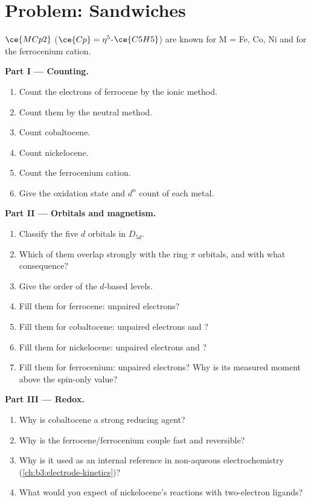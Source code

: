 \section{Problem: Sandwiches}

\begin{problem}
\label{pb:b3:organometallic-bonding:1}
 $\ce{MCp2}$ ($\ce{Cp} = \eta^5$-$\ce{C5H5}$) are known for M = Fe, Co, Ni and for the ferrocenium cation.

\medskip\noindent\textbf{Part I --- Counting.}
\begin{enumerate}
  \item Count the electrons of ferrocene by the ionic method.
  \item Count them by the neutral method.
  \item Count cobaltocene.
  \item Count nickelocene.
  \item Count the ferrocenium cation.
  \item Give the oxidation state and $d^n$ count of each metal.
\end{enumerate}

\medskip\noindent\textbf{Part II --- Orbitals and magnetism.}
\begin{enumerate}[resume]
  \item Classify the five $d$ orbitals in $D_{5d}$.
  \item Which of them overlap strongly with the ring $\pi$ orbitals, and with what
        consequence?
  \item Give the order of the $d$-based levels.
  \item Fill them for ferrocene: unpaired electrons?
  \item Fill them for cobaltocene: unpaired electrons and ?
  \item Fill them for nickelocene: unpaired electrons and ?
  \item Fill them for ferrocenium: unpaired electrons? Why is its measured moment
        above the spin-only value?
\end{enumerate}

\medskip\noindent\textbf{Part III --- Redox.}
\begin{enumerate}[resume]
  \item Why is cobaltocene a strong reducing agent?
  \item Why is the ferrocene/ferrocenium couple fast and reversible?
  \item Why is it used as an internal reference in non-aqueous electrochemistry
        (\cref{ch:b3:electrode-kinetics})?
  \item What would you expect of nickelocene's reactions with two-electron
        ligands?
\end{enumerate}


\end{problem}
